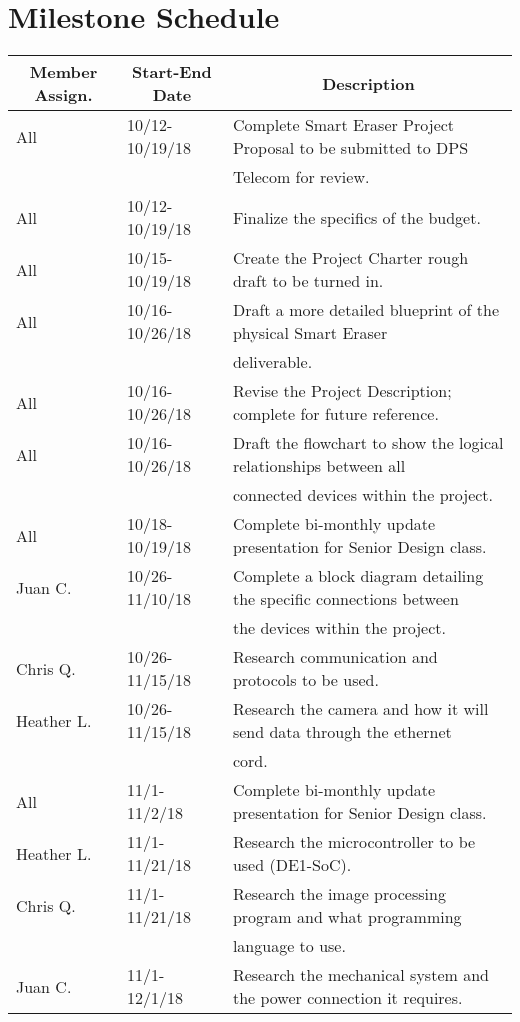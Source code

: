 \section{Milestone Schedule}
\setlength{\parindent}{5ex}
\begin{table} [H]	
	\normalsize
	\centering
	\begin{tabular}{|l|l|l|}
		\hline
		\multicolumn{1}{|c|}{\textbf{Member Assign.}} & \multicolumn{1}{|c|}{\textbf{Start-End Date}} & \multicolumn{1}{|c|}{\textbf{Description}} \\
		\hline
		All & 10/12-10/19/18 & Complete Smart Eraser Project Proposal to be submitted to DPS\\
		& & Telecom for review. \\
		\hline
		All & 10/12-10/19/18 & Finalize the specifics of the budget. \\
		\hline
		All & 10/15-10/19/18 & 
		Create the Project Charter rough draft to be turned in.\\
		\hline
		All & 10/16-10/26/18 & Draft a more detailed blueprint of the physical Smart Eraser \\
		& & deliverable. \\
		\hline
		All & 10/16-10/26/18 & 
		Revise the Project Description; complete for future reference.\\
		\hline
		All & 10/16-10/26/18 & 
		Draft the flowchart to show the logical relationships between all \\
		& & connected devices within the project.\\
		\hline
		All & 10/18-10/19/18 & 
		Complete bi-monthly update presentation for Senior Design class.\\
		\hline
		Juan C. & 10/26-11/10/18 & 
		Complete a block diagram detailing the specific connections between \\
		& & the devices within the project.\\
		\hline
		Chris Q. & 10/26-11/15/18 & 
		Research communication and protocols to be used.\\
		\hline
		Heather L. & 10/26-11/15/18 & 
		Research the camera and how it will send data through the ethernet \\
		& & cord.\\
		\hline
		All & 11/1-11/2/18 & 
		Complete bi-monthly update presentation for Senior Design class.\\
		\hline
		Heather L. & 11/1-11/21/18 & 
		Research the microcontroller to be used  (DE1-SoC).\\
		\hline
		Chris Q. & 11/1-11/21/18 & 
		Research the image processing program and what programming \\
		& & language to use.\\
		\hline
		Juan C. & 11/1-12/1/18 &
		Research the mechanical system and the power connection it requires. \\
		\hline
		

\end{tabular}
\end{table}
